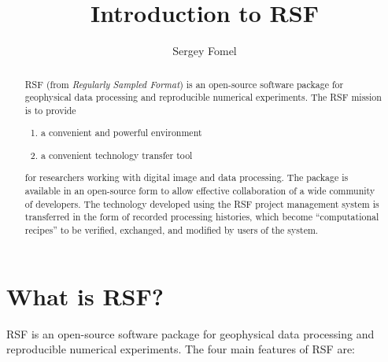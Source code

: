 \title{Introduction to RSF}
\author{Sergey Fomel}

\maketitle

\begin{abstract}

RSF (from \emph{Regularly Sampled Format}) is an open-source software
package for geophysical data processing and reproducible numerical
experiments. The RSF mission is to provide
\begin{enumerate}
\item a convenient and powerful environment
\item a convenient technology transfer tool
\end{enumerate}
for researchers working with digital image and data processing. The package is
available in an open-source form to allow effective collaboration of a wide
community of developers. The technology developed using the RSF project
management system is transferred in the form of recorded processing histories,
which become ``computational recipes'' to be verified, exchanged, and modified
by users of the system.

\end{abstract}

\section{What is RSF?}

RSF is an open-source software package for geophysical data processing
and reproducible numerical experiments. The four main features of RSF
are:

